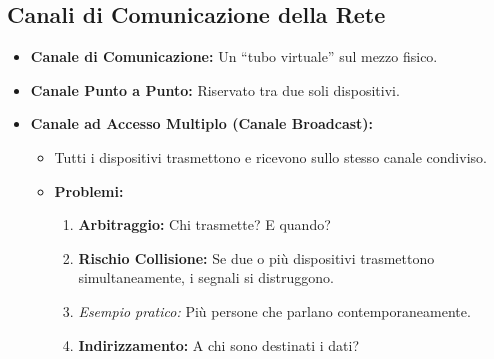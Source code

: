 \documentclass{article}
\begin{document}
\subsection{Canali di Comunicazione della Rete}
\begin{itemize}
    \item \textbf{Canale di Comunicazione:} Un “tubo virtuale” sul mezzo fisico.
    \item \textbf{Canale Punto a Punto:} Riservato tra due soli dispositivi.
    \item \textbf{Canale ad Accesso Multiplo (Canale Broadcast):}
    \begin{itemize}
        \item Tutti i dispositivi trasmettono e ricevono sullo stesso canale condiviso.
        \item \textbf{Problemi:}
        \begin{enumerate}
            \item \textbf{Arbitraggio:} Chi trasmette? E quando?
            \item \textbf{Rischio Collisione:} Se due o più dispositivi trasmettono simultaneamente, i segnali si distruggono.
            \item \textit{Esempio pratico:} Più persone che parlano contemporaneamente.
            \item \textbf{Indirizzamento:} A chi sono destinati i dati?
        \end{enumerate}
    \end{itemize}
\end{itemize}
\end{document}
